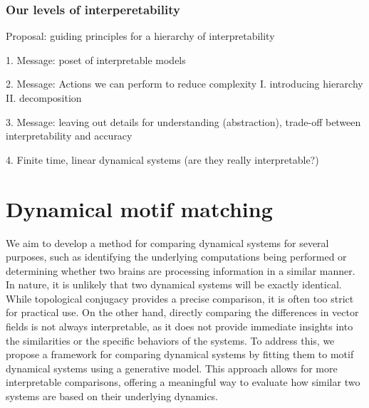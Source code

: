\documentclass{article}
\theoremstyle{definition} \newtheorem{definition}{Definition}  \newtheorem{example}{Example}
\theoremstyle{remark} \newtheorem{remark}{Remark}
\newcounter{ct}
\begin{document}
\subsubsection{Our levels of interperetability}
Proposal: guiding principles for a hierarchy of interpretability

1. Message: poset of interpretable models

2. Message: Actions we can perform to reduce complexity
I. introducing hierarchy 
\citep{Vermani2024b}
\citep{geadah2024parsing, geadah2025modeling}
II. decomposition

3. Message: leaving out details for understanding (abstraction), trade-off between interpretability and accuracy

4. Finite time, linear dynamical systems (are they really interpretable?) 






\section{Dynamical motif matching}\label{sec:dmm}
We aim to develop a method for comparing dynamical systems for several purposes, such as identifying the underlying computations being performed or determining whether two brains are processing information in a similar manner. In nature, it is unlikely that two dynamical systems will be exactly identical.
 While topological conjugacy provides a precise comparison, it is often too strict for practical use.
 On the other hand, directly comparing the differences in vector fields is not always interpretable, as it does not provide immediate insights into the similarities or the specific behaviors of the systems.
  To address this, we propose a framework for comparing dynamical systems by fitting them to motif dynamical systems using a generative model.
   This approach allows for more interpretable comparisons, offering a meaningful way to evaluate how similar two systems are based on their underlying dynamics.
\end{document}
